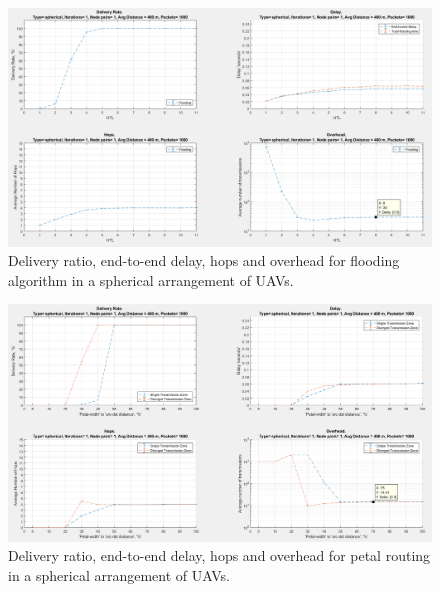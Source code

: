 \thispagestyle{lscapedplain}
\begin{landscape}
\begin{figure}
\centering
\includegraphics[width=1\textwidth]{ncsuthesis-0.6/Appendix-A/figs/flood_spherical.png}
\caption{Delivery ratio, end-to-end delay, hops and overhead for flooding algorithm in a spherical arrangement of UAVs. }
\label{fig:flood_spherical}
\end{figure}
\end{landscape}

\thispagestyle{lscapedplain}
\begin{landscape}
\begin{figure}
\centering
\includegraphics[width=1\textwidth]{ncsuthesis-0.6/Appendix-A/figs/petal_spherical.png}
\caption{Delivery ratio, end-to-end delay, hops and overhead for petal routing in a spherical arrangement of UAVs.}
\label{fig:petal_spherical}
\end{figure}
\end{landscape}

